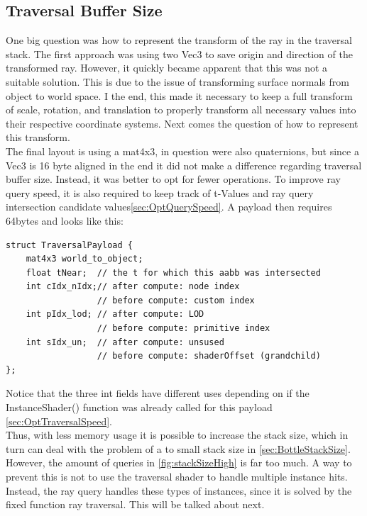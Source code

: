 \subsection{Traversal Buffer Size}
\label{sec:OptStackMemorySize}
One big question was how to represent the transform of the ray in the traversal stack. The first approach was using two Vec3 to save origin and direction of the transformed ray. However, it quickly became apparent that this was not a suitable solution. This is due to the issue of transforming surface normals from object to world space. I the end, this made it necessary to keep a full transform of scale, rotation, and translation to properly transform all necessary values into their respective coordinate systems. Next comes the question of how to represent this transform.\\
The final layout is using a mat4x3, in question were also quaternions, but since a Vec3 is 16 byte aligned in the end it did not make a difference regarding traversal buffer size. Instead, it was better to opt for fewer operations. To improve ray query speed, it is also required to keep track of t-Values and ray query intersection candidate values\ref{sec:OptQuerySpeed}. A payload then requires 64bytes and looks like this:
\begin{lstlisting}
struct TraversalPayload {
	mat4x3 world_to_object;
	float tNear;  // the t for which this aabb was intersected
	int cIdx_nIdx;// after compute: node index
	              // before compute: custom index
	int pIdx_lod; // after compute: LOD
	              // before compute: primitive index
	int sIdx_un;  // after compute: unsused
	              // before compute: shaderOffset (grandchild)
};
\end{lstlisting}
Notice that the three int fields have different uses depending on if the InstanceShader() function was already called for this payload \ref{sec:OptTraversalSpeed}.\\
Thus, with less memory usage it is possible to increase the stack size, which in turn can deal with the problem of a to small stack size in \ref{sec:BottleStackSize}. However, the amount of queries in \ref{fig:stackSizeHigh} is far too much. A way to prevent this is not to use the traversal shader to handle multiple instance hits. Instead, the ray query handles these types of instances, since it is solved by the fixed function ray traversal. This will be talked about next.
